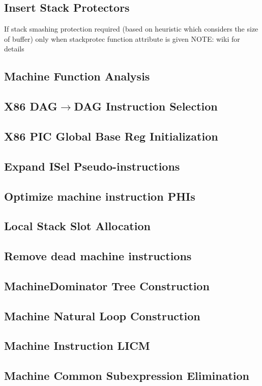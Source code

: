 \documentclass{myproc}
\begin{document}
\subsection{Insert Stack Protectors}
\bit
\w If stack smashing protection required (based on heuristic which considers
the size of buffer)
\w only when stackprotec function attribute is given 
\w NOTE: wiki   for details
\eit

\subsection{Machine Function Analysis}
\subsection{X86 DAG$\rightarrow$DAG Instruction Selection}
\subsection{X86 PIC Global Base Reg Initialization}
\subsection{Expand ISel Pseudo-instructions}
\subsection{Optimize machine instruction PHIs}
\subsection{Local Stack Slot Allocation}
\subsection{Remove dead machine instructions}
\subsection{MachineDominator Tree Construction}
\subsection{Machine Natural Loop Construction}
\subsection{Machine Instruction LICM}
\subsection{Machine Common Subexpression Elimination}
\end{document}
